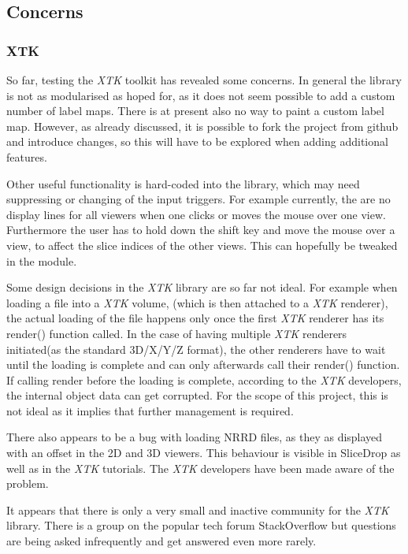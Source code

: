 \documentclass[a4paper,11pt,titlepage]{article}
\begin{document}
\subsection{Concerns}

\subsubsection{XTK}

So far, testing the \textit{XTK} toolkit has revealed some concerns. In general the library is not as modularised as hoped for, as it does not seem possible to add a custom number of label maps. There is at present also no way to paint a custom label map. However, as already discussed, it is possible to fork the project from github and introduce changes, so this will have to be explored when adding additional features.

Other useful functionality is hard-coded into the library, which may need suppressing or changing of the input triggers. For example currently, the are no display lines for all viewers when one clicks or moves the mouse over one view. Furthermore the user has to hold down the shift key and move the mouse over a view, to affect the slice indices of the other views. This can hopefully be tweaked in the module.

Some design decisions in the \textit{XTK} library are so far not ideal. For example when loading a file into a \textit{XTK} volume, (which is then attached to a \textit{XTK} renderer), the actual loading of the file happens only once the first \textit{XTK} renderer has its render() function called. In the case of having multiple \textit{XTK} renderers initiated(as the standard 3D/X/Y/Z format), the other renderers have to wait until the loading is complete and can only afterwards call their render() function. If calling render before the loading is complete, according to the \textit{XTK} developers, the internal object data can get corrupted. For the scope of this project, this is not ideal as it implies that further management is required.

There also appears to be a bug with loading NRRD files, as they as displayed with an offset in the 2D and 3D viewers. This behaviour is visible in SliceDrop as well as in the \textit{XTK} tutorials. The \textit{XTK} developers have been made aware of the problem.

It appears that there is only a very small and inactive community for the \textit{XTK} library. There is a group on the popular tech forum StackOverflow but questions are being asked infrequently and get answered even more rarely.
\end{document}
